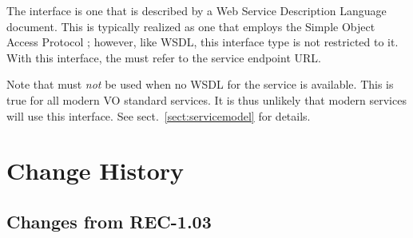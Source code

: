 \documentclass[11pt,a4paper]{ivoa}
\begin{document}

The  interface is one that is described by a Web
Service Description Language \citep{booth07} document. This is typically
realized as one that employs the Simple Object Access Protocol
\citep{std:SOAP}; however, like WSDL, this interface type is not
restricted to it. With this interface, the  must
refer to the service endpoint URL.

Note that  must \emph{not} be used when no WSDL for
the service is available.  This is true for all modern VO standard
services.  It is thus unlikely that modern services will use this
interface.  See sect.~\ref{sect:servicemodel} for details.

\appendix

\section{Change History}

\subsection{Changes from REC-1.03}
\end{document}
